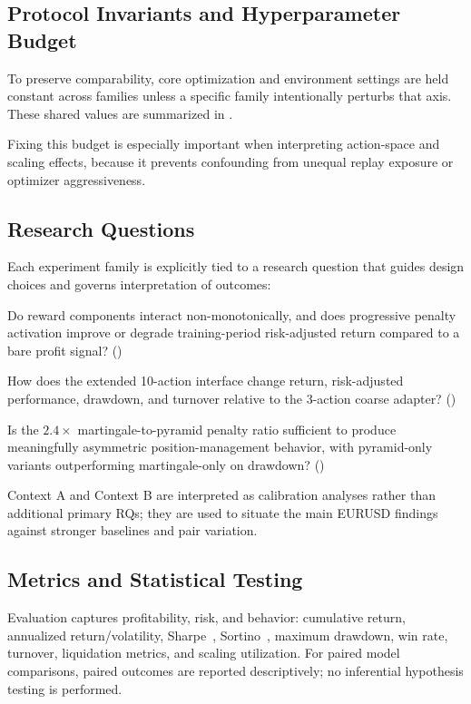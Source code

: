 \subsection{Protocol Invariants and Hyperparameter Budget}
To preserve comparability, core optimization and environment settings are held constant across families unless a specific family intentionally perturbs that axis. These shared values are summarized in .



\noindent Fixing this budget is especially important when interpreting action-space and scaling effects, because it prevents confounding from unequal replay exposure or optimizer aggressiveness.

\subsection{Research Questions}
Each experiment family is explicitly tied to a research question that guides design choices and governs interpretation of outcomes:
\begin{description}[leftmargin=1.8em, style=nextline]
    \item[\textbf{RQ1} (Reward Interactions):] Do reward components interact non-monotonically, and does progressive penalty activation improve or degrade training-period risk-adjusted return compared to a bare profit signal? ()
	\item[\textbf{RQ2} (Action Granularity):] How does the extended 10-action interface change return, risk-adjusted performance, drawdown, and turnover relative to the 3-action coarse adapter? ()
    \item[\textbf{RQ3} (Scaling Asymmetry):] Is the $2.4\times$ martingale-to-pyramid penalty ratio sufficient to produce meaningfully asymmetric position-management behavior, with pyramid-only variants outperforming martingale-only on drawdown? ()
\end{description}
Context A and Context B are interpreted as calibration analyses rather than additional primary RQs; they are used to situate the main EURUSD findings against stronger baselines and pair variation.

\subsection{Metrics and Statistical Testing}
Evaluation captures profitability, risk, and behavior: cumulative return, annualized return/volatility, Sharpe~\citep{sharpe1994sharpe}, Sortino~\citep{sortino1994performance}, maximum drawdown, win rate, turnover, liquidation metrics, and scaling utilization. For paired model comparisons, paired outcomes are reported descriptively; no inferential hypothesis testing is performed.

